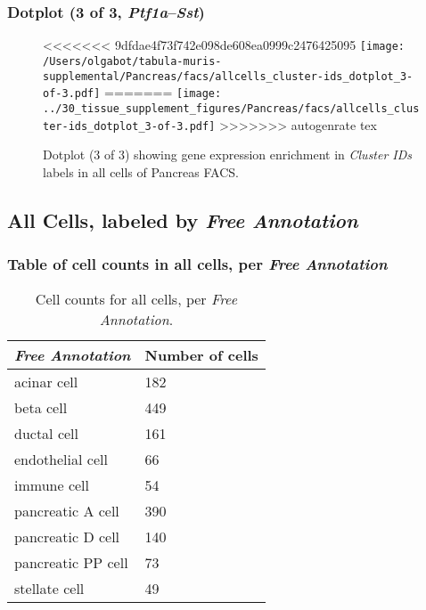 \clearpage

\subsubsection{Dotplot (3 of 3, \emph{Ptf1a}--\emph{Sst})}
\begin{figure}[h]
\centering
<<<<<<< 9dfdae4f73f742e098de608ea0999c2476425095
\texttt{[image: /Users/olgabot/tabula-muris-supplemental/Pancreas/facs/allcells\_cluster-ids\_dotplot\_3-of-3.pdf]}
=======
\texttt{[image: ../30\_tissue\_supplement\_figures/Pancreas/facs/allcells\_cluster-ids\_dotplot\_3-of-3.pdf]}
>>>>>>> autogenrate tex

\caption{ Dotplot (3 of 3)  showing gene expression enrichment in \emph{Cluster IDs} labels in all cells of Pancreas FACS. }
\end{figure}


\clearpage

\subsection{All Cells, labeled by \emph{Free Annotation}}
\subsubsection{Table of cell counts in all cells, per \emph{Free Annotation}}\begin{table}[h]
\centering
\label{my-label}
\begin{tabular}{@{}ll@{}}
\toprule

\emph{Free Annotation}& Number of cells \\ \midrule
acinar cell & 182 \\

beta cell & 449 \\

ductal cell & 161 \\

endothelial cell & 66 \\

immune cell & 54 \\

pancreatic A cell & 390 \\

pancreatic D cell & 140 \\

pancreatic PP cell & 73 \\

stellate cell & 49 \\
\bottomrule
\end{tabular}
\caption{Cell counts for all cells, per \emph{Free Annotation}.}
\end{table}

